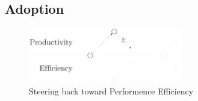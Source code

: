 

\subsection{Adoption} \label{chapter3:software-productivity:adoption}

\begin{figure}[!h]
\begin{center}
\includegraphics[width=0.6\textwidth]{../ressources/state-of-the-art-2.pdf}
\end{center}
\caption{Steering back toward Performence Efficiency}
\label{fig:state-of-the-art-2}
\end{figure}


